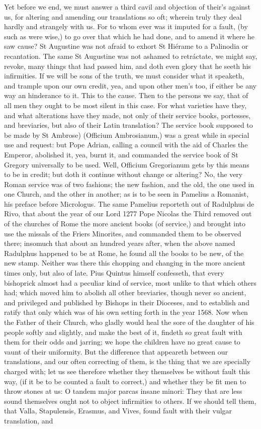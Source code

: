 Yet before we end, we must answer a third cavil and objection of their's against us, for altering and amending our translations so oft; wherein truly they deal hardly and strangely with us. For to whom ever was it imputed for a fault, (by such as were wise,) to go over that which he had done, and to amend it where he saw cause? St Augustine was not afraid to exhort St Hiérame to a Palinodia or recantation. The same St Augustine was not ashamed to retráctate, we might say, revoke, many things that had passed him, and doth even glory that he seeth his infirmities. If we will be sons of the truth, we must consider what it speaketh, and trample upon our own credit, yea, and upon other men's too, if either be any way an hinderance to it. This to the cause. Then to the persons we say, that of all men they ought to be most silent in this case. For what varieties have they, and what alterations have they made, not only of their service books, portesses, and breviaries, but also of their Latin translation? The service book supposed to be made by St Ambrose) (Officium Ambrosianum,) was a great while in special use and request: but Pope Adrian, calling a council with the aid of Charles the Emperor, abolished it, yea, burnt it, and commanded the service book of St Gregory universally to be used. Well, Officium Gregorianum gets by this means to be in credit; but doth it continue without change or altering? No, the very Roman service was of two fashions; the new fashion, and the old, the one used in one Church, and the other in another; as is to be seen in Pamelius a Romanist, his preface before Micrologus. The same Pamelius reporteth out of Radulphus de Rivo, that about the year of our Lord 1277 Pope Nicolas the Third removed out of the churches of Rome the more ancient books (of service,) and brought into use the missals of the Friers Minorites, and commanded them to be observed there; insomuch that about an hundred years after, when the above named Radulphus happened to be at Rome, he found all the books to be new, of the new stamp. Neither was there this chopping and changing in the more ancient times only, but also of late. Pius Quintus himself confesseth, that every bishoprick almost had a peculiar kind of service, most unlike to that which others had; which moved him to abolish all other breviaries, though never so ancient, and privileged and published by Bishops in their Dioceses, and to establish and ratify that only which was of his own setting forth in the year 1568. Now when the Father of their Church, who gladly would heal the sore of the daughter of his people softly and slightly, and make the best of it, findeth so great fault with them for their odds and jarring; we hope the children have no great cause to vaunt of their uniformity. But the difference that appeareth between our translations, and our often correcting of them, is the thing that we are specially charged with; let us see therefore whether they themselves be without fault this way, (if it be to be counted a fault to correct,) and whether they be fit men to throw stones at us: O tandem major parcas insane minori: They that are less sound themselves ought not to object infirmities to others. If we should tell them, that Valla, Stapulensis, Erasmus, and Vives, found fault with their vulgar translation, and 